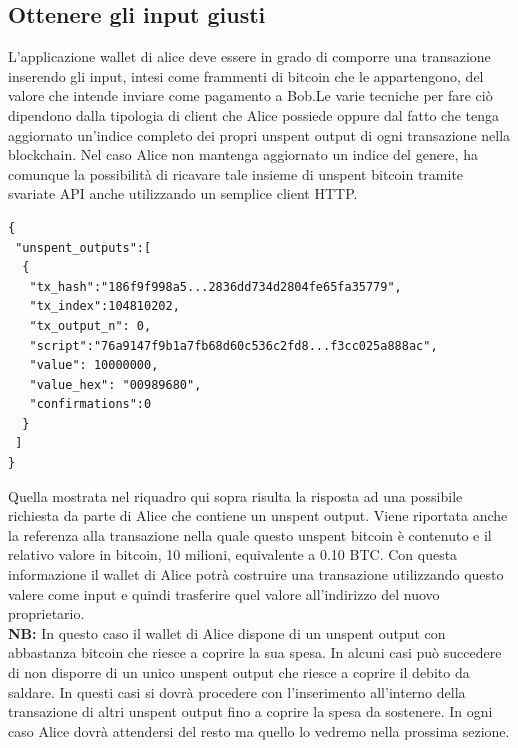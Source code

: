 \subsection*{Ottenere gli input giusti}
L'applicazione wallet di alice deve essere in grado di comporre una transazione inserendo gli input, intesi come frammenti di bitcoin che le appartengono, del valore che intende inviare come pagamento a Bob.Le varie tecniche per fare ciò dipendono dalla tipologia di client che Alice possiede oppure dal fatto che tenga aggiornato un'indice completo dei propri unspent output di ogni transazione nella blockchain. Nel caso Alice non mantenga aggiornato un indice del genere, ha comunque la possibilità di ricavare tale insieme di unspent bitcoin tramite svariate API anche utilizzando un semplice client HTTP. 
\begin{lstlisting}
{
 "unspent_outputs":[
  {
   "tx_hash":"186f9f998a5...2836dd734d2804fe65fa35779",
   "tx_index":104810202,
   "tx_output_n": 0,
   "script":"76a9147f9b1a7fb68d60c536c2fd8...f3cc025a888ac",
   "value": 10000000,
   "value_hex": "00989680",
   "confirmations":0
  }
 ]
}
\end{lstlisting}
Quella mostrata nel riquadro qui sopra risulta la risposta ad una possibile richiesta da parte di Alice che contiene un unspent output. Viene riportata anche la referenza alla transazione nella quale questo unspent bitcoin è contenuto e il relativo valore in bitcoin, 10 milioni, equivalente a 0.10 BTC. Con questa informazione il wallet di Alice potrà costruire una transazione utilizzando questo valere come input e quindi trasferire quel valore all'indirizzo del nuovo proprietario.\\
\textbf{NB:} In questo caso il wallet di Alice dispone di un unspent output con abbastanza bitcoin che riesce a coprire la sua spesa. In alcuni casi può succedere di non disporre di un unico unspent output che riesce a coprire il debito da saldare. In questi casi si dovrà procedere con l'inserimento all'interno della transazione di altri unspent output fino a coprire la spesa da sostenere. In ogni caso Alice dovrà attendersi del resto ma quello lo vedremo nella prossima sezione.

